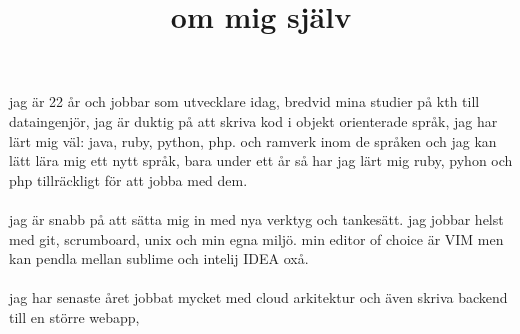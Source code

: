 \documentclass{article}
\title{om mig sj{\"a}lv}
\begin{document}
\maketitle
jag är 22 år och jobbar som utvecklare idag, bredvid mina studier på kth till dataingenjör, jag är duktig på att skriva kod i objekt orienterade språk, jag har lärt mig väl: java, ruby, python, php. och ramverk inom de språken och jag kan lätt lära mig ett nytt språk, bara under ett år så har jag lärt mig ruby, pyhon och php tillräckligt för att jobba med dem.
\\\\
jag är snabb på att sätta mig in med nya verktyg och tankesätt. jag jobbar helst med git, scrumboard, unix och min egna miljö. min editor of choice är VIM men kan pendla mellan sublime och intelij IDEA oxå.
\\\\
jag har senaste året jobbat mycket med cloud arkitektur och även skriva backend till en större webapp,
\end{document}
